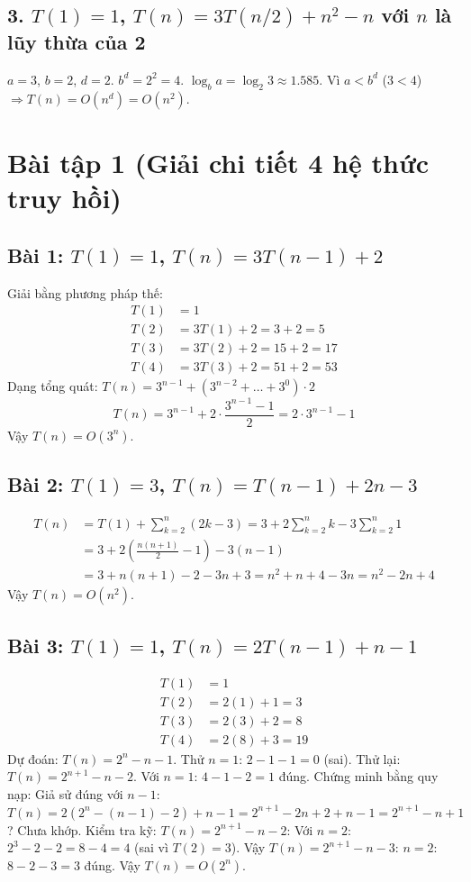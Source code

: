 \documentclass{article}
\begin{document}
\subsection*{3. $T(1) = 1$, $T(n) = 3T(n/2) + n^2 - n$ với $n$ là lũy thừa của 2}
$a=3$, $b=2$, $d=2$.
$b^d = 2^2 = 4$. $\log_b a = \log_2 3 \approx 1.585$.
Vì $a < b^d$ ($3 < 4$) $\Rightarrow T(n) = O(n^d) = O(n^2)$.

\section*{Bài tập 1 (Giải chi tiết 4 hệ thức truy hồi)}

\subsection*{Bài 1: $T(1) = 1$, $T(n) = 3T(n-1) + 2$}
Giải bằng phương pháp thế:
\begin{align*}
T(1) &= 1 \\
T(2) &= 3T(1) + 2 = 3 + 2 = 5 \\
T(3) &= 3T(2) + 2 = 15 + 2 = 17 \\
T(4) &= 3T(3) + 2 = 51 + 2 = 53
\end{align*}
Dạng tổng quát: $T(n) = 3^{n-1} + (3^{n-2} + \dots + 3^0) \cdot 2$
\[
T(n) = 3^{n-1} + 2 \cdot \frac{3^{n-1} - 1}{2} = 2 \cdot 3^{n-1} - 1
\]
Vậy $T(n) = O(3^n)$.

\subsection*{Bài 2: $T(1) = 3$, $T(n) = T(n-1) + 2n - 3$}
\begin{align*}
T(n) &= T(1) + \sum_{k=2}^n (2k - 3) = 3 + 2\sum_{k=2}^n k - 3\sum_{k=2}^n 1 \\
&= 3 + 2\left(\frac{n(n+1)}{2} - 1\right) - 3(n-1) \\
&= 3 + n(n+1) - 2 - 3n + 3 = n^2 + n + 4 - 3n = n^2 - 2n + 4
\end{align*}
Vậy $T(n) = O(n^2)$.

\subsection*{Bài 3: $T(1) = 1$, $T(n) = 2T(n-1) + n - 1$}
\begin{align*}
T(1) &= 1 \\
T(2) &= 2(1) + 1 = 3 \\
T(3) &= 2(3) + 2 = 8 \\
T(4) &= 2(8) + 3 = 19
\end{align*}
Dự đoán: $T(n) = 2^{n} - n - 1$. Thử $n=1$: $2 - 1 - 1 = 0$ (sai). Thử lại:
$T(n) = 2^{n+1} - n - 2$. Với $n=1$: $4-1-2=1$ đúng.
Chứng minh bằng quy nạp:
Giả sử đúng với $n-1$: $T(n) = 2(2^{n} - (n-1) - 2) + n - 1 = 2^{n+1} - 2n + 2 + n - 1 = 2^{n+1} - n + 1$? Chưa khớp. 
Kiểm tra kỹ: $T(n) = 2^{n+1} - n - 2$:
Với $n=2$: $2^3 - 2 - 2 = 8 - 4 = 4$ (sai vì $T(2)=3$).
Vậy $T(n) = 2^{n+1} - n - 3$:
$n=2$: $8 - 2 - 3 = 3$ đúng.
Vậy $T(n) = O(2^n)$.
\end{document}
